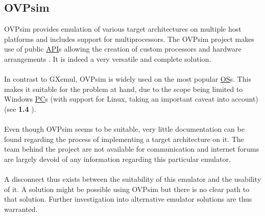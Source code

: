 \subsection{OVPsim}
\label{OVPsim}
OVPsim provides emulation of various target architectures on multiple host platforms and includes support for multiprocessors. The OVPsim project makes use of public \hyperref[listAbr]{API}s allowing the creation of custom processors and hardware arrangements \cite{Imperas2020}. It is indeed a very versatile and complete solution.
\\\\
In contrast to GXemul, OVPsim is widely used on the most popular \hyperref[listAbr]{OS}s. This makes it suitable for the problem at hand, due to the scope being limited to Windows \hyperref[listAbr]{PC}s (with support for Linux, taking an important caveat into account)(see \textbf{1.4 }).
\\\\
	Even though OVPsim seems to be suitable, very little documentation can be found regarding the process of implementing a target architecture on it. The team behind the project are not available for communication and internet forums are largely devoid of any information regarding this particular emulator. 
\\\\
A disconnect thus exists between the suitability of this emulator and the usability of it. A solution might be possible using OVPsim but there is no clear path to that solution. Further investigation into alternative emulator solutions are thus warranted.

